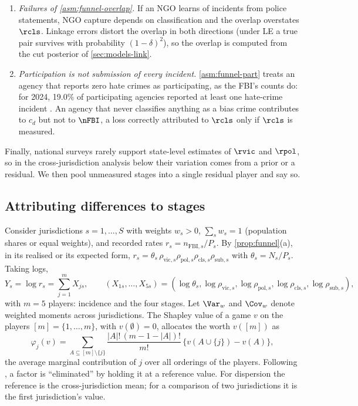\begin{enumerate}[(1)]
  \item \emph{Failures of \ref{asm:funnel-overlap}.} If an NGO learns of incidents from police statements, NGO capture depends on classification and the overlap overstates $\rcls$. Linkage errors distort the overlap in both directions (under LE a true pair survives with probability $(1-\delta)^2$), so the overlap is computed from the cut posterior of \cref{sec:models-link}.
  \item \emph{Participation is not submission of every incident.} \ref{asm:funnel-part} treats an agency that reports zero hate crimes as participating, as the FBI's counts do: for 2024, 19.0\% of participating agencies reported at least one hate-crime incident \citep{fbi2025summary}. An agency that never classifies anything as a bias crime contributes to $c_d$ but not to $\nFBI$, a loss correctly attributed to $\rcls$ only if $\rcls$ is measured.
\end{enumerate}
Finally, national surveys rarely support state-level estimates of $\rvic$ and $\rpol$, so in the cross-jurisdiction analysis below their variation comes from a prior or a residual. We then pool unmeasured stages into a single residual player and say so.

\subsection{Attributing differences to stages}\label{sec:funnel-shapley}

Consider jurisdictions $s=1,\dots,S$ with weights $w_s>0$, $\sum_sw_s=1$ (population shares or equal weights), and recorded rates $r_s=n_{\mathrm{FBI},s}/P_s$. By \cref{prop:funnel}(a), in its realised or its expected form, $r_s=\theta_s\,\rho_{\mathrm{vic},s}\rho_{\mathrm{pol},s}\rho_{\mathrm{cls},s}\rho_{\mathrm{sub},s}$ with $\theta_s=N_s/P_s$. Taking logs,
\begin{equation}\label{eq:funnel-logs}
  Y_s=\log r_s=\sum_{j=1}^{m}X_{js},\qquad
  (X_{1s},\dots,X_{5s})=(\log\theta_s,\log\rho_{\mathrm{vic},s},\log\rho_{\mathrm{pol},s},\log\rho_{\mathrm{cls},s},\log\rho_{\mathrm{sub},s}),
\end{equation}
with $m=5$ players: incidence and the four stages. Let $\Var_w$ and $\Cov_w$ denote weighted moments across jurisdictions. The Shapley value \citep{shapley1953} of a game $v$ on the players $[m]=\{1,\dots,m\}$, with $v(\emptyset)=0$, allocates the worth $v([m])$ as
\begin{equation}\label{eq:funnel-shapley-def}
  \varphi_j(v)=\sum_{A\subseteq[m]\setminus\{j\}}\frac{|A|!\,(m-1-|A|)!}{m!}\,\{v(A\cup\{j\})-v(A)\},
\end{equation}
the average marginal contribution of $j$ over all orderings of the players. Following \citet{shorrocks2013}, a factor is ``eliminated'' by holding it at a reference value. For dispersion the reference is the cross-jurisdiction mean; for a comparison of two jurisdictions it is the first jurisdiction's value.


